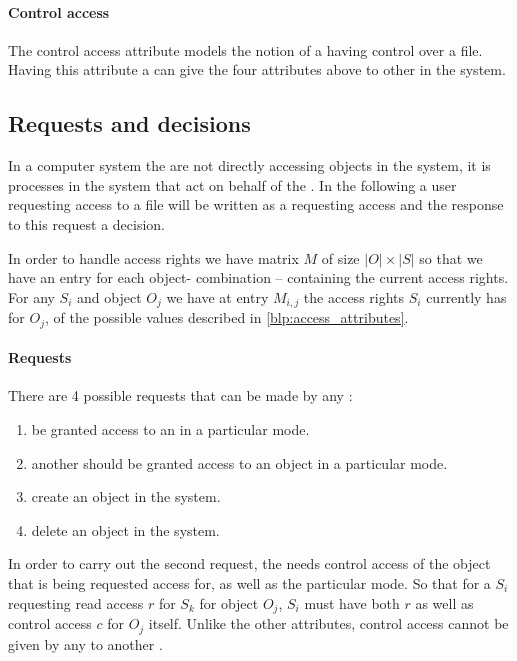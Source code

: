 \paragraph{Control access}
The control access attribute models the notion of a \ssubject{} having control over a file.
Having this attribute a \ssubject{} can give the four attributes above to other \subjects{} in the system.

\subsection{Requests and decisions}
In a computer system the \subjects{} are not directly accessing objects in the system, it is processes in the system that act on behalf of the \ssubject{}.
In the following a user requesting access to a file will be written as a \ssubject{} requesting access and the response to this request a decision.

In order to handle access rights we have matrix $M$ of size $|O| \times |S|$ so that we have an entry for each object-\ssubject{} combination -- containing the current access rights.
For any \ssubject{} $S_i$ and object $O_j$ we have at entry $M_{i,j}$ the access rights $S_i$ currently has for $O_j$, of the possible values described in \cref{blp:access_attributes}.

\paragraph{Requests}
There are 4 possible requests that can be made by any \ssubject{}:
\begin{enumerate}
  \item be granted access to an \ssubject{} in a particular mode.
  \item another \ssubject{} should be granted access to an object in a particular mode.
  \item create an object in the system.
  \item delete an object in the system.
\end{enumerate}

In order to carry out the second request, the \ssubject{} needs control access of the object that is being requested access for, as well as the particular mode.
So that for a \ssubject{} $S_i$ requesting read access $r$ for \ssubject{} $S_k$ for object $O_j$, $S_i$ must have both $r$ as well as control access $c$ for $O_j$ itself.
Unlike the other attributes, control access cannot be given by any \ssubject{} to another \ssubject{}.

